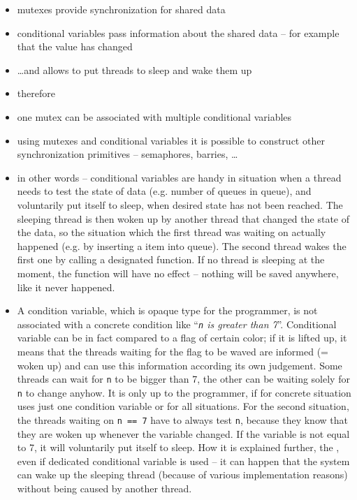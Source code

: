
\begin{slide}
\begin{itemize}
\item mutexes provide synchronization for shared data
\item conditional variables pass information about the shared data --
for example that the value has changed
\item \dots{}and allows to put threads to sleep and wake them up
\item therefore 
\item one mutex can be associated with multiple conditional variables
\item using mutexes and conditional variables it is possible to construct
other synchronization primitives -- semaphores, barries, \dots
\end{itemize}
\end{slide}

\label{CONDITION_VARIABLES}

\begin{itemize}
\item in other words -- conditional variables are handy in situation when a 
thread needs to test the state of  data (e.g. number of queues
in queue), and voluntarily put itself to sleep, when desired state has not
been reached. The sleeping thread is then woken up by another thread that
changed the state of the data, so the situation which the first thread was
waiting on actually happened (e.g. by inserting a item into queue).
The second thread wakes the first one by calling a designated function.
If no thread is sleeping at the moment, the function will have no effect --
nothing will be saved anywhere, like it never happened.
\item A condition variable, which is opaque type for the programmer, is not
associated with a concrete condition like ``\emph{\texttt{n} is greater than
7}''. Conditional variable can be in fact compared to a flag of certain color;
if it is lifted up, it means that the threads waiting for the flag to be waved
are informed (= woken up) and can use this information according its own
judgement. Some threads can wait for \texttt{n} to be bigger than 7, the other
can be waiting solely for \texttt{n} to change anyhow. It is only up to the
programmer, if for concrete situation uses just one condition variable or
for all situations. For the second situation, the threads waiting on 
\texttt{n == 7} have to always test \texttt{n}, because they know that they
are woken up whenever the variable changed. If the variable is not equal to 7,
it will voluntarily put itself to sleep. How it is explained further,
the , even if dedicated conditional
variable is used -- it can happen that the system can wake up the sleeping
thread (because of various implementation reasons) without being caused by
another thread.
\end{itemize}

